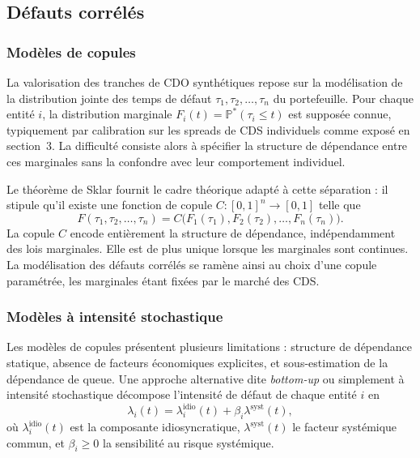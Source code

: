 \subsection{Défauts corrélés}

\subsubsection{Modèles de copules}\label{subsubsec:modele_copule}

La valorisation des tranches de CDO synthétiques repose sur la modélisation de la distribution
jointe des temps de défaut $\tau_1, \tau_2, \ldots, \tau_n$ du portefeuille. Pour chaque entité $i$,
la distribution marginale $F_i(t) = \mathbb{P}^*(\tau_i \leq t)$ est supposée connue, typiquement par
calibration sur les spreads de CDS individuels comme exposé en section~3. La difficulté consiste
alors à spécifier la structure de dépendance entre ces marginales sans la confondre avec leur
comportement individuel.

Le théorème de Sklar fournit le cadre théorique adapté à cette séparation :
il stipule qu'il existe une fonction de copule $C : [0,1]^n \rightarrow [0,1]$ telle que
\begin{equation}
    F(\tau_1, \tau_2, \ldots, \tau_n) = C\bigl(F_1(\tau_1), F_2(\tau_2), \ldots, F_n(\tau_n)\bigr).
\end{equation}
La copule $C$ encode entièrement la structure de dépendance, indépendamment des lois marginales.
Elle est de plus unique lorsque les marginales sont continues. La modélisation des défauts corrélés
se ramène ainsi au choix d'une copule paramétrée, les marginales étant fixées par le marché des CDS.

\subsubsection{Modèles à intensité stochastique}

Les modèles de copules présentent plusieurs limitations : structure de dépendance 
statique, absence de facteurs économiques explicites, et sous-estimation de la 
dépendance de queue. Une approche alternative dite \emph{bottom-up} ou simplement à intensité stochastique
décompose l'intensité de défaut de chaque entité $i$ en
\begin{equation}
\lambda_i(t) = \lambda_i^{\text{idio}}(t) + \beta_i \lambda^{\text{syst}}(t),
\end{equation}
où $\lambda_i^{\text{idio}}(t)$ est la composante idiosyncratique, 
$\lambda^{\text{syst}}(t)$ le facteur systémique commun, et $\beta_i \geq 0$ la 
sensibilité au risque systémique.

